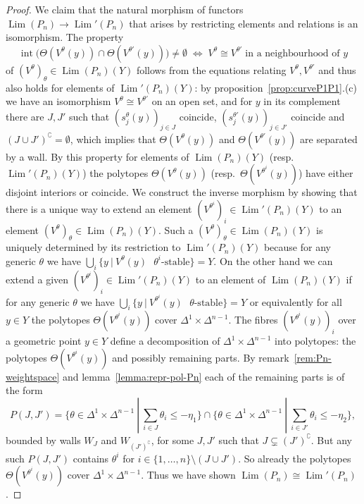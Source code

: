 \documentclass[ALCO,ThmDefs,Unicode,epreuves]{cedram}
\DeclareMathOperator{\interior}{int}
\DeclareMathOperator{\Lim}{Lim}
\begin{document}
\begin{proof}
We claim that the natural morphism of functors $\Lim(P_n)\to\Lim'(P_n)$
that arises by restricting elements and relations is an isomorphism. 
The property 
\[
\interior\big(\Theta(V^{\theta}(y))\cap \Theta(V^{\theta'}(y))\big)\neq\emptyset
\;\Longleftrightarrow\;V^\theta\cong V^{\theta'}\;\text{in a neighbourhood of $y$}
\]
of $(V^\theta)_\theta\in\Lim(P_n)(Y)$ follows from the equations relating 
$V^\theta,V^{\theta'}$ and thus also holds for elements of $\Lim'(P_n)(Y)$:
by proposition~\ref{prop:curveP1P1}.(c) we have an isomorphism $V^\theta\cong V^{\theta'}$ 
on an open set, and for $y$ in its complement there are $J,J'$ such that 
$(s^\theta_j(y))_{j\in J}$ coincide, $(s^{\theta'}_j(y))_{j\in J'}$ coincide
and $(J\cup J')^\complement=\emptyset$, which implies that 
$\Theta(V^{\theta}(y))$ and $\Theta(V^{\theta'}(y))$ are separated by a wall.
By this property for elements of $\Lim(P_n)(Y)$ (resp.\ $\Lim'(P_n)(Y)$) the polytopes
$\Theta(V^\theta(y))$ (resp.\ $\Theta(V^{\theta^i}(y))$) have either disjoint 
interiors or coincide.
We construct the inverse morphism by showing that there is a unique 
way to extend an element $(V^{\theta^i})_i\in\Lim'(P_n)(Y)$ to an element 
$(V^\theta)_\theta\in\Lim(P_n)(Y)$. Such a $(V^\theta)_\theta\in\Lim(P_n)(Y)$ 
is uniquely determined by its restriction to $\Lim'(P_n)(Y)$
because for any generic $\theta$ we have 
$\bigcup_i\{y\:|\:\text{$V^\theta(y)$ $\theta^i$-stable}\}=Y$.
On the other hand we can extend a given $(V^{\theta^i})_i\in\Lim'(P_n)(Y)$
to an element of $\Lim(P_n)(Y)$ if for any generic $\theta$ we have 
$\bigcup_i\{y\:|\:\text{$V^{\theta^i}(y)$ $\theta$-stable}\}=Y$ or
equivalently for all $y\in Y$ the polytopes $\Theta(V^{\theta^i}(y))$ cover 
$\Delta^1\times\Delta^{n-1}$.
The fibres $(V^{\theta^i}(y))_i$ over a geometric point $y\in Y$ define a 
decomposition of $\Delta^1\times\Delta^{n-1}$ into polytopes:
the polytopes $\Theta(V^{\theta^i}(y))$ and possibly remaining parts. 
By remark~\ref{rem:Pn-weightspace} and lemma~\ref{lemma:repr-pol-Pn} 
each of the remaining parts is of the form 
\[\textstyle
P(J,J')=\{\theta\in\Delta^1\times\Delta^{n-1}\:|\:\sum_{i\in J}\theta_i\leq-\eta_1\}
\cap\{\theta\in\Delta^1\times\Delta^{n-1}\:|\:\sum_{i\in J'}\theta_i\leq-\eta_2\},
\]
\ie bounded by walls $W_J$ and $W_{(J')^\complement}$,
for some $J,J'$ such that $J\subsetneq(J')^\complement$. 
But any such $P(J,J')$ contains $\theta^i$ for $i\in\{1,\ldots,n\}\setminus(J\cup J')$.
So already the polytopes $\Theta(V^{\theta^i}(y))$ cover $\Delta^1\times\Delta^{n-1}$. 
Thus we have shown $\Lim(P_n)\cong\Lim'(P_n)$.


\end{proof}
\end{document}
